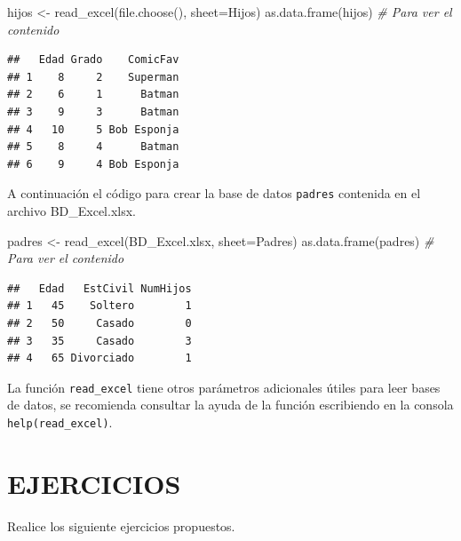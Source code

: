 \documentclass[
]{book}
\makeatletter
\newenvironment{Shaded}{\begin{snugshade}}{\end{snugshade}}
\newcommand{\AttributeTok}[1]{\textcolor[rgb]{0.77,0.63,0.00}{#1}}
\newcommand{\CommentTok}[1]{\textcolor[rgb]{0.56,0.35,0.01}{\textit{#1}}}
\newcommand{\FunctionTok}[1]{\textcolor[rgb]{0.00,0.00,0.00}{#1}}
\newcommand{\NormalTok}[1]{#1}
\newcommand{\OtherTok}[1]{\textcolor[rgb]{0.56,0.35,0.01}{#1}}
\newcommand{\StringTok}[1]{\textcolor[rgb]{0.31,0.60,0.02}{#1}}
\newenvironment{kframe}{%
\medskip{}
\setlength{\fboxsep}{.8em}
 \def\at@end@of@kframe{}%
 \ifinner\ifhmode%
  \def\at@end@of@kframe{\end{minipage}}%
  \begin{minipage}{\columnwidth}%
 \fi\fi%
 \def\FrameCommand##1{\hskip\@totalleftmargin \hskip-\fboxsep
 \colorbox{shadecolor}{##1}\hskip-\fboxsep
     \hskip-\linewidth \hskip-\@totalleftmargin \hskip\columnwidth}%
 \MakeFramed {\advance\hsize-\width
   \@totalleftmargin\z@ \linewidth\hsize
   \@setminipage}}%
 {\par\unskip\endMakeFramed%
 \at@end@of@kframe}
\renewenvironment{Shaded}{\begin{kframe}}{\end{kframe}}
\makeatother
\begin{document}
\begin{Shaded}
\begin{Highlighting}[]
\NormalTok{hijos }\OtherTok{\textless{}{-}} \FunctionTok{read\_excel}\NormalTok{(}\FunctionTok{file.choose}\NormalTok{(), }\AttributeTok{sheet=}\StringTok{\textquotesingle{}Hijos\textquotesingle{}}\NormalTok{)}
\FunctionTok{as.data.frame}\NormalTok{(hijos)  }\CommentTok{\# Para ver el contenido}
\end{Highlighting}
\end{Shaded}

\begin{verbatim}
##   Edad Grado    ComicFav
## 1    8     2    Superman
## 2    6     1      Batman
## 3    9     3      Batman
## 4   10     5 Bob Esponja
## 5    8     4      Batman
## 6    9     4 Bob Esponja
\end{verbatim}

A continuación el código para crear la base de datos \texttt{padres} contenida en el archivo BD\_Excel.xlsx.

\begin{Shaded}
\begin{Highlighting}[]
\NormalTok{padres }\OtherTok{\textless{}{-}} \FunctionTok{read\_excel}\NormalTok{(}\StringTok{\textquotesingle{}BD\_Excel.xlsx\textquotesingle{}}\NormalTok{, }\AttributeTok{sheet=}\StringTok{\textquotesingle{}Padres\textquotesingle{}}\NormalTok{)}
\FunctionTok{as.data.frame}\NormalTok{(padres)  }\CommentTok{\# Para ver el contenido}
\end{Highlighting}
\end{Shaded}

\begin{verbatim}
##   Edad   EstCivil NumHijos
## 1   45    Soltero        1
## 2   50     Casado        0
## 3   35     Casado        3
## 4   65 Divorciado        1
\end{verbatim}

La función \texttt{read\_excel} tiene otros parámetros adicionales útiles para leer bases de datos, se recomienda consultar la ayuda de la función escribiendo en la consola \texttt{help(read\_excel)}.

\hypertarget{ejercicios-3}{%
\section*{EJERCICIOS}\label{ejercicios-3}}

Realice los siguiente ejercicios propuestos.
\end{document}
